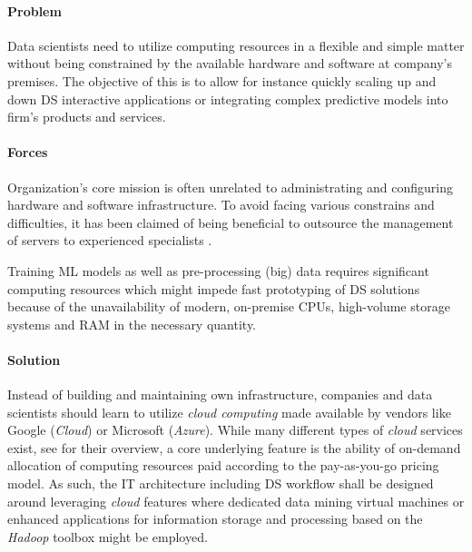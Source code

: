\paragraph*{Problem}
Data scientists need to utilize computing resources in a flexible and simple matter without being constrained by the available hardware and software at company's premises.
The objective of this is to allow for instance quickly scaling up and down \ac{DS} interactive applications or integrating complex predictive models into firm's products and services.

\paragraph*{Forces}
\begin{compactitem}
  \item Organization's core mission is often unrelated to administrating and configuring hardware and software infrastructure. 
  To avoid facing various constrains and difficulties, it has been claimed of being beneficial to outsource the management of servers to experienced specialists \parencite{MarstonSean2011}.
  \item Training \ac{ML} models as well as pre-processing (big) data requires significant computing resources which might impede fast prototyping of \ac{DS} solutions because of the unavailability of modern, on-premise \acp{CPU}, high-volume storage systems and \ac{RAM} in the necessary quantity. 
\end{compactitem}

\paragraph*{Solution}
Instead of building and maintaining own infrastructure, companies and data scientists should learn to utilize \emph{cloud computing} made available by vendors like Google (\emph{Cloud}) or Microsoft (\emph{Azure}). 
While many different types of \emph{cloud} services exist, see \textcite{Zhang2010CloudChallenges} for their overview, a core underlying feature is the ability of on-demand allocation of computing resources paid according to the pay-as-you-go pricing model.  
As such, the \ac{IT} architecture including \ac{DS} workflow shall be designed around leveraging \emph{cloud} features where dedicated data mining virtual machines or enhanced applications for information storage and processing based on the \emph{Hadoop} toolbox might be employed.

